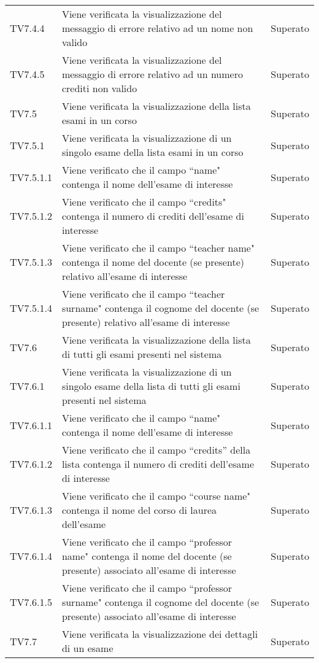 \documentclass[PianoDiQualifica.tex]{subfiles}
\begin{document}
\begin{longtable}[H]{P{2cm}P{8.5cm}P{3cm}}
	TV7.4.4 & Viene verificata la visualizzazione del messaggio di errore relativo ad un nome non valido & Superato \\ 
	TV7.4.5 & Viene verificata la visualizzazione del messaggio di errore relativo ad un numero crediti non valido & Superato \\ 
	TV7.5 & Viene verificata la visualizzazione della lista esami in un corso & Superato \\ 
	TV7.5.1 & Viene verificata la visualizzazione di un singolo esame della lista esami in un corso & Superato \\ 
	TV7.5.1.1 & Viene verificato che il campo ``name" contenga il nome dell'esame di interesse & Superato \\ 
	TV7.5.1.2 & Viene verificato che il campo ``credits" contenga il numero di crediti dell'esame di interesse & Superato \\ 
	TV7.5.1.3 & Viene verificato che il campo ``teacher name" contenga il nome del docente (se presente) relativo all'esame di interesse & Superato \\ 
	TV7.5.1.4 & Viene verificato che il campo ``teacher surname" contenga il cognome del docente (se presente) relativo all'esame di interesse & Superato \\ 
	TV7.6 & Viene verificata la visualizzazione della lista di tutti gli esami presenti nel sistema & Superato \\ 
	TV7.6.1 & Viene verificata la visualizzazione di un singolo esame della lista di tutti gli esami presenti nel sistema & Superato \\ 
	TV7.6.1.1 & Viene verificato che il campo ``name" contenga il nome dell'esame di interesse & Superato \\ 
	TV7.6.1.2 & Viene verificato che il campo ``credits” della lista contenga il numero di crediti dell'esame di interesse & Superato \\ 
	TV7.6.1.3 & Viene verificato che il campo ``course name" contenga il nome del corso di laurea dell'esame & Superato \\ 
	TV7.6.1.4 & Viene verificato che il campo ``professor name" contenga il nome del docente (se presente) associato all'esame di interesse & Superato \\ 
	TV7.6.1.5 & Viene verificato che il campo ``professor surname" contenga il cognome del docente (se presente) associato all'esame di interesse & Superato \\ 
	TV7.7 & Viene verificata la visualizzazione dei dettagli di un esame & Superato \\ 

\end{longtable}
\end{document}
